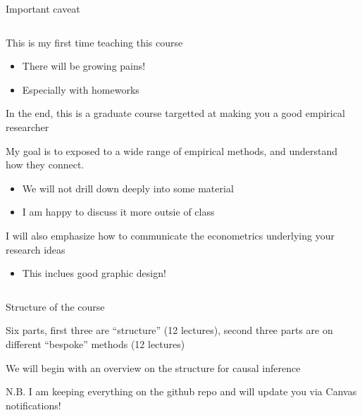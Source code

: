 \documentclass[notes,11pt, aspectratio=169]{beamer}
\newenvironment{wideitemize}{\itemize\addtolength{\itemsep}{10pt}}{\enditemize}
\begin{document}
\begin{frame}{Important caveat}
\begin{columns}[T] %
\begin{column}{.7\textwidth}
  \begin{wideitemize}
  \item This is my first time teaching this course
    \begin{itemize}
    \item There will be growing pains!
    \item Especially with homeworks
    \end{itemize}
  \item In the end, this is a graduate course targetted at making you a good empirical researcher
  \item My goal is to exposed to a wide range of empirical methods,
    and understand how they connect.
    \begin{itemize}
    \item We will not drill down deeply into some material
    \item I am happy to discuss it more outsie of class
    \end{itemize}
  \item I will also emphasize how to communicate the econometrics underlying your research ideas
    \begin{itemize}
    \item This inclues good graphic design!
    \end{itemize}
  \end{wideitemize}
\end{column}%
\hfill%
\begin{column}{.38\textwidth}
  \makebox[\linewidth][c]{
    \resizebox{\linewidth}{!}{
    }
  }
\end{column}%
\end{columns}
\end{frame}


\begin{frame}{Structure of the course}
  \begin{wideitemize}
  \item Six parts, first three are ``structure'' (12 lectures), second
    three parts are on different ``bespoke'' methods (12 lectures)
  \item We will begin with an overview on the structure for causal inference
  \item N.B. I am keeping everything on the github repo and will
    update you via Canvas notifications!
  \end{wideitemize}
\end{frame}
\end{document}
